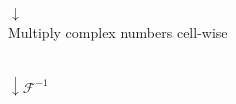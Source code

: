 \documentclass[10pt,a4paper]{article}
\begin{document}
\begin{figure}
\begin{center}
\begin{minipage}{0.5\linewidth}
\begin{minipage}{0.5\linewidth}
\begin{center}
    \end{center}\end{minipage}\begin{center}
            $\downarrow$\\
        Multiply complex numbers cell-wise
    \end{center}\begin{center}\begin{minipage}{0.5\linewidth}\begin{center}
    \end{center}\end{minipage}\\
        $\downarrow \mathcal{F}^{-1}$\\
    \begin{minipage}{0.5\linewidth}\begin{center}

\end{center}
\end{minipage}
\end{center}
\end{minipage}
\end{center}
\end{figure}
\end{document}
